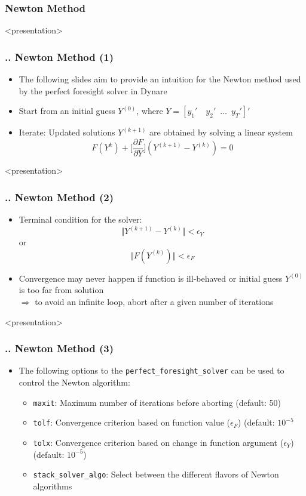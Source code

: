\documentclass[11pt,aspectratio=169]{beamer}
\begin{document}
\subsubsection{Newton Method}
\begin{frame}<presentation>
	\frametitle{{\thesection.\thesubsection.\thesubsubsection} Newton Method (1)}
	\begin{itemize}
		\item The following slides aim to provide an intuition for the Newton method used by the perfect foresight solver in Dynare
		\item Start from an initial guess $Y^{(0)}$, where $Y=[y_1' \quad y_2' \enspace \ldots \enspace y_T']'$
		\item Iterate: Updated solutions $Y^{(k+1)}$ are obtained by solving a linear system 
		$$F(Y^{k}) + \bigg[\frac{\partial F}{\partial Y}\bigg] (Y^{(k+1)} - Y^{(k)}) = 0$$
	\end{itemize}
\end{frame}
\begin{frame}<presentation>
	\frametitle{{\thesection.\thesubsection.\thesubsubsection} Newton Method (2)}
	\begin{itemize}
		\item Terminal condition for the solver:
		$$\Vert Y^{(k+1)} - Y^{(k)} \Vert < \epsilon_Y$$
		or
		$$\Vert F(Y^{(k)}) \Vert < \epsilon_F$$
		\item Convergence may never happen if function is ill-behaved or initial guess $Y^{(0)}$ is too far from solution\\
		$\Rightarrow$ to avoid an infinite loop, abort after a given number of iterations
	\end{itemize}
\end{frame}
\begin{frame}<presentation>
	\frametitle{{\thesection.\thesubsection.\thesubsubsection} Newton Method (3)}
	\begin{itemize}
		\item The following options to the \texttt{perfect\_foresight\_solver} can be used to control the Newton algorithm:\\
		\begin{itemize}
			\item \texttt{maxit}: Maximum number of iterations before aborting (default: 50)
			\item \texttt{tolf}: Convergence criterion based on function value ($\epsilon_F$) (default: $10^{-5}$ 
			\item \texttt{tolx}: Convergence criterion based on change in function argument ($\epsilon_Y$) (default: $10^{-5}$)
			\item \texttt{stack\_solver\_algo}: Select between the different flavors of Newton algorithms
		\end{itemize}
	\end{itemize}
\end{frame}
\end{document}
